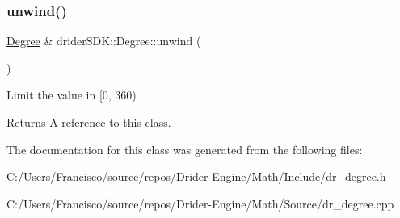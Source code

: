 \subsubsection{\texorpdfstring{unwind()}{unwind()}}
{\footnotesize\ttfamily \hyperlink{classdrider_s_d_k_1_1_degree}{Degree} \& drider\+S\+D\+K\+::\+Degree\+::unwind (\begin{DoxyParamCaption}{ }\end{DoxyParamCaption})}

Limit the value in \mbox{[}0, 360)

\begin{DoxyReturn}{Returns}
A reference to this class. 
\end{DoxyReturn}


The documentation for this class was generated from the following files\+:\begin{DoxyCompactItemize}
\item 
C\+:/\+Users/\+Francisco/source/repos/\+Drider-\/\+Engine/\+Math/\+Include/dr\+\_\+degree.\+h\item 
C\+:/\+Users/\+Francisco/source/repos/\+Drider-\/\+Engine/\+Math/\+Source/dr\+\_\+degree.\+cpp\end{DoxyCompactItemize}

